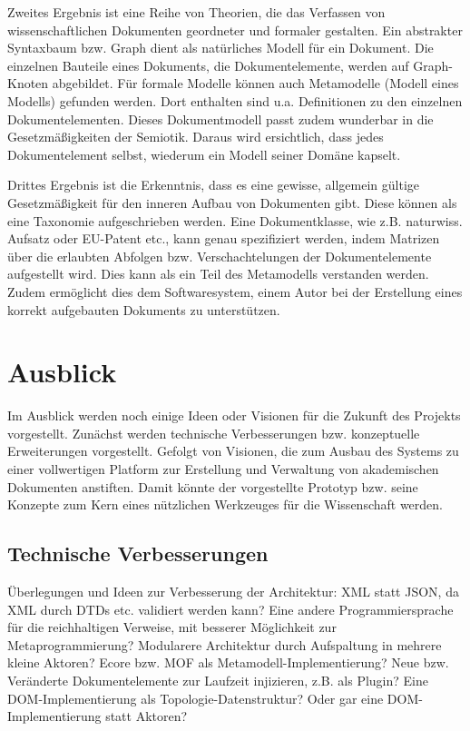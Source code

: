  
Zweites Ergebnis ist eine Reihe von Theorien, die das Verfassen von wissenschaftlichen Dokumenten geordneter und formaler gestalten. Ein abstrakter Syntaxbaum bzw. Graph dient als natürliches Modell für ein Dokument. Die einzelnen Bauteile eines Dokuments, die Dokumentelemente, werden auf Graph-Knoten abgebildet. Für formale Modelle können auch Metamodelle (Modell eines Modells) gefunden werden. Dort enthalten sind u.a. Definitionen zu den einzelnen Dokumentelementen. Dieses Dokumentmodell passt zudem wunderbar in die Gesetzmäßigkeiten der Semiotik. Daraus wird ersichtlich, dass jedes Dokumentelement selbst, wiederum ein Modell seiner Domäne kapselt.

 
Drittes Ergebnis ist die Erkenntnis, dass es eine gewisse, allgemein gültige Gesetzmäßigkeit für den inneren Aufbau von Dokumenten gibt. Diese können als eine Taxonomie aufgeschrieben werden. Eine Dokumentklasse, wie z.B. naturwiss. Aufsatz oder EU-Patent etc., kann genau spezifiziert werden, indem Matrizen über die erlaubten Abfolgen bzw. Verschachtelungen der Dokumentelemente aufgestellt wird. Dies kann als ein Teil des Metamodells verstanden werden. Zudem ermöglicht dies dem Softwaresystem, einem Autor bei der Erstellung eines korrekt aufgebauten Dokuments zu unterstützen.

 
\section{Ausblick}\label{}
 
Im Ausblick werden noch einige Ideen oder Visionen für die Zukunft des Projekts vorgestellt. Zunächst werden technische Verbesserungen bzw. konzeptuelle Erweiterungen vorgestellt. Gefolgt von Visionen, die zum Ausbau des Systems zu einer vollwertigen Platform zur Erstellung und Verwaltung von akademischen Dokumenten anstiften. Damit könnte der vorgestellte Prototyp bzw. seine Konzepte zum Kern eines nützlichen Werkzeuges für die Wissenschaft werden.

 
\subsection{Technische Verbesserungen}\label{}
 
Überlegungen und Ideen zur Verbesserung der Architektur: XML statt JSON, da XML durch DTDs etc. validiert werden kann? Eine andere Programmiersprache für die reichhaltigen Verweise, mit besserer Möglichkeit zur Metaprogrammierung? Modularere Architektur durch Aufspaltung in mehrere kleine Aktoren? Ecore bzw. MOF als Metamodell-Implementierung? Neue bzw. Veränderte Dokumentelemente zur Laufzeit injizieren, z.B. als Plugin? Eine DOM-Implementierung als Topologie-Datenstruktur? Oder gar eine DOM-Implementierung statt Aktoren?

